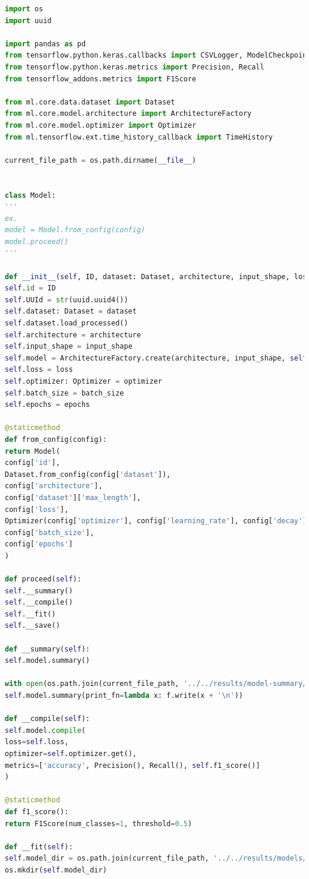 \documentclass{article}
\begin{document}
\begin{lstlisting}[language=Python, caption=ml.core.model.model]
import os
import uuid

import pandas as pd
from tensorflow.python.keras.callbacks import CSVLogger, ModelCheckpoint
from tensorflow.python.keras.metrics import Precision, Recall
from tensorflow_addons.metrics import F1Score

from ml.core.data.dataset import Dataset
from ml.core.model.architecture import ArchitectureFactory
from ml.core.model.optimizer import Optimizer
from ml.tensorflow.ext.time_history_callback import TimeHistory

current_file_path = os.path.dirname(__file__)


class Model:
'''
ex.
model = Model.from_config(config)
model.proceed()
'''

def __init__(self, ID, dataset: Dataset, architecture, input_shape, loss, optimizer: Optimizer, batch_size, epochs):
self.id = ID
self.UUId = str(uuid.uuid4())
self.dataset: Dataset = dataset
self.dataset.load_processed()
self.architecture = architecture
self.input_shape = input_shape
self.model = ArchitectureFactory.create(architecture, input_shape, self.dataset.embedding)
self.loss = loss
self.optimizer: Optimizer = optimizer
self.batch_size = batch_size
self.epochs = epochs

@staticmethod
def from_config(config):
return Model(
config['id'],
Dataset.from_config(config['dataset']),
config['architecture'],
config['dataset']['max_length'],
config['loss'],
Optimizer(config['optimizer'], config['learning_rate'], config['decay']),
config['batch_size'],
config['epochs']
)

def proceed(self):
self.__summary()
self.__compile()
self.__fit()
self.__save()

def __summary(self):
self.model.summary()

with open(os.path.join(current_file_path, '../../results/model-summary/model-' + self.UUId), 'w') as f:
self.model.summary(print_fn=lambda x: f.write(x + '\n'))

def __compile(self):
self.model.compile(
loss=self.loss,
optimizer=self.optimizer.get(),
metrics=['accuracy', Precision(), Recall(), self.f1_score()]
)

@staticmethod
def f1_score():
return F1Score(num_classes=1, threshold=0.5)

def __fit(self):
self.model_dir = os.path.join(current_file_path, '../../results/models/' + self.UUId)
os.mkdir(self.model_dir)


\end{lstlisting}
\end{document}
